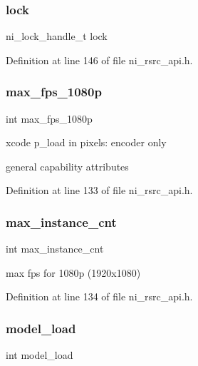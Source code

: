 \subsubsection{\texorpdfstring{lock}{lock}}
{\footnotesize\ttfamily ni\+\_\+lock\+\_\+handle\+\_\+t lock}



Definition at line 146 of file ni\+\_\+rsrc\+\_\+api.\+h.

\mbox{\label{struct__ni__device__info_ad00a3c768a8b7c786d01bbbe31e9d810}} 
\subsubsection{\texorpdfstring{max\_fps\_1080p}{max\_fps\_1080p}}
{\footnotesize\ttfamily int max\+\_\+fps\+\_\+1080p}

xcode p\+\_\+load in pixels\+: encoder only

general capability attributes 

Definition at line 133 of file ni\+\_\+rsrc\+\_\+api.\+h.

\mbox{\label{struct__ni__device__info_a798ec1d68cf857ec8b87ce67aec7e068}} 
\subsubsection{\texorpdfstring{max\_instance\_cnt}{max\_instance\_cnt}}
{\footnotesize\ttfamily int max\+\_\+instance\+\_\+cnt}

max fps for 1080p (1920x1080) 

Definition at line 134 of file ni\+\_\+rsrc\+\_\+api.\+h.

\mbox{\label{struct__ni__device__info_a538a6b74864f5bde38bf1ed9bca85577}} 
\subsubsection{\texorpdfstring{model\_load}{model\_load}}
{\footnotesize\ttfamily int model\+\_\+load}

